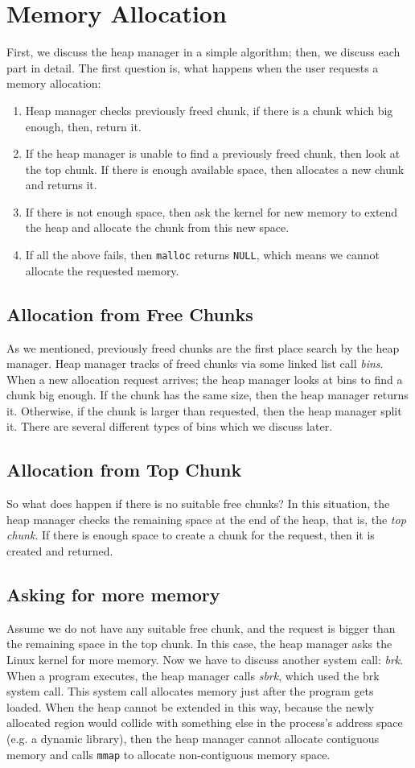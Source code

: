 \documentclass{masterthesis}
\newcommand*\mallocc{\lstinline{malloc}}
\begin{document}
\section{Memory Allocation}
 First, we discuss the heap manager in a simple algorithm; then, we discuss each part in detail. The first question is, what happens when the user requests a memory allocation:
\begin{enumerate}
	\item Heap manager checks previously freed chunk, if there is a chunk which big enough, then, return it.
	\item If the heap manager is unable to find a previously freed chunk, then look at the top chunk. If there is enough available space, then allocates a new chunk and returns it.
	\item If there is not enough space, then ask the kernel for new memory to extend the heap and allocate the chunk from this new space.
	\item If all the above fails, then \mallocc{} returns \lstinline{NULL}, which means we cannot allocate the requested memory.
\end{enumerate}

\subsection{Allocation from Free Chunks}
As we mentioned, previously freed chunks are the first place search by the heap manager. Heap manager tracks of freed chunks via some linked list call \emph{bins}. When a new allocation request arrives; the heap manager looks at bins to find a chunk big enough. If the chunk has the same size, then the heap manager returns it. Otherwise, if the chunk is larger than requested, then the heap manager split it. There are several different types of bins which we discuss later.

\subsection{Allocation from Top Chunk}
So what does happen if there is no suitable free chunks? In this situation, the heap manager checks the remaining space at the end of the heap, that is, the \emph{top chunk}. If there is enough space to create a chunk for the request, then it is created and returned.

\subsection{Asking for more memory}
Assume we do not have any suitable free chunk, and the request is bigger than the remaining space in the top chunk. In this case, the heap manager asks the Linux kernel for more memory. Now we have to discuss another system call: \emph{brk}. When a program executes, the heap manager calls \emph{sbrk}, which used the brk system call. This system call allocates memory just after the program gets loaded.
When the heap cannot be extended in this way, because the newly allocated region would collide with something else in the process's address space (e.g. a dynamic library), then the heap manager cannot allocate contiguous memory and calls \lstinline{mmap} to allocate non-contiguous memory space.
\end{document}
